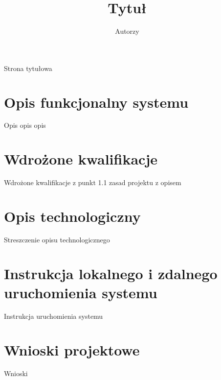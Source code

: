 \documentclass[12pt,a4paper]{article}
\author{Autorzy}
\title{Tytuł}
\begin{document}
Strona tytułowa
\newpage
\section{Opis funkcjonalny systemu}
Opis opis opis
\section{Wdrożone kwalifikacje}
Wdrożone kwalifikacje z punkt 1.1 zasad projektu z opisem
\section{Opis technologiczny}
Streszczenie opisu technologicznego
\section{Instrukcja lokalnego i zdalnego uruchomienia systemu}
Instrukcja uruchomienia systemu
\section{Wnioski projektowe}
Wnioski
\end{document}
